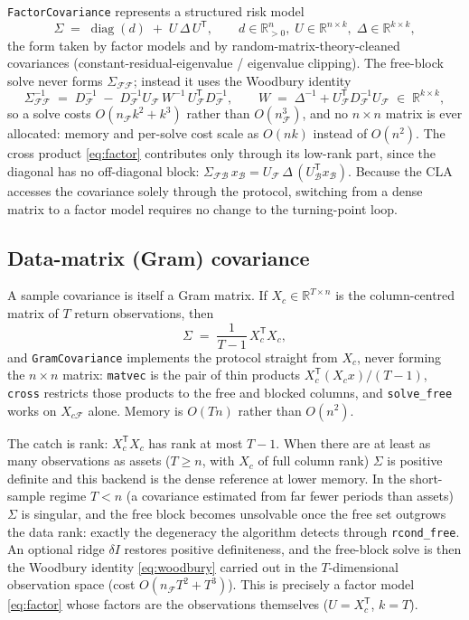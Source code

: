 \documentclass[11pt]{article}
\newcommand{\R}{\mathbb{R}}
\newcommand{\Sig}{\Sigma}
\newcommand{\F}{\mathcal{F}}        %
\newcommand{\B}{\mathcal{B}}        %
\newcommand{\trans}{^{\mathsf{T}}}
\newcommand{\inv}{^{-1}}
\begin{document}
\texttt{FactorCovariance} represents a structured risk model
\begin{equation}
\label{eq:factor}
\Sig \;=\; \operatorname{diag}(d) \;+\; U\,\Delta\,U\trans,
\qquad d\in\R^{n}_{>0},\; U\in\R^{n\times k},\; \Delta\in\R^{k\times k},
\end{equation}
the form taken by factor models \citep{sharpe1963} and by random-matrix-theory-cleaned
covariances (constant-residual-eigenvalue / eigenvalue clipping). The free-block solve
never forms
$\Sig_{\F\F}$; instead it uses the Woodbury identity
\begin{equation}
\label{eq:woodbury}
\Sig_{\F\F}\inv \;=\; D_\F\inv \;-\; D_\F\inv U_\F\, W\inv\, U_\F\trans D_\F\inv,
\qquad
W \;=\; \Delta\inv + U_\F\trans D_\F\inv U_\F \;\in\;\R^{k\times k},
\end{equation}
so a solve costs $O(n_\F k^2 + k^3)$ rather than $O(n_\F^3)$, and no $n\times n$ matrix
is ever allocated: memory and per-solve cost scale as $O(nk)$ instead of $O(n^2)$.
The cross product \eqref{eq:factor} contributes only through its low-rank part, since
the diagonal has no off-diagonal block:
\(
\Sig_{\F\B}\,x_\B = U_\F\,\Delta\,(U_\B\trans x_\B).
\)
Because the CLA accesses the covariance solely through the protocol, switching from a
dense matrix to a factor model requires no change to the turning-point loop.

\subsection{Data-matrix (Gram) covariance}
\label{sec:gram}

A sample covariance is itself a Gram matrix. If $X_c\in\R^{T\times n}$ is the
column-centred matrix of $T$ return observations, then
\begin{equation}
\label{eq:gram}
\Sig \;=\; \frac{1}{T-1}\,X_c\trans X_c,
\end{equation}
and \texttt{GramCovariance} implements the protocol straight from $X_c$, never
forming the $n\times n$ matrix: \texttt{matvec} is the pair of thin products
$X_c\trans(X_c x)/(T-1)$, \texttt{cross} restricts those products to the free and
blocked columns, and \texttt{solve\_free} works on $X_{c\F}$ alone. Memory is
$O(Tn)$ rather than $O(n^2)$.

The catch is rank: $X_c\trans X_c$ has rank at most $T-1$. When there are at least as
many observations as assets ($T\ge n$, with $X_c$ of full column rank) $\Sig$ is
positive definite and this backend is the dense reference at lower memory. In the
short-sample regime $T<n$ (a covariance estimated from far fewer periods than
assets) $\Sig$ is singular, and the free block becomes unsolvable once the free set
outgrows the data rank: exactly the degeneracy the algorithm detects through
\texttt{rcond\_free}. An optional ridge $\delta I$ restores positive definiteness,
and the free-block solve is then the Woodbury identity \eqref{eq:woodbury} carried
out in the $T$-dimensional observation space (cost $O(n_\F T^2 + T^3)$). This is
precisely a factor model \eqref{eq:factor} whose factors are the observations
themselves ($U=X_c\trans$, $k=T$).
\end{document}
